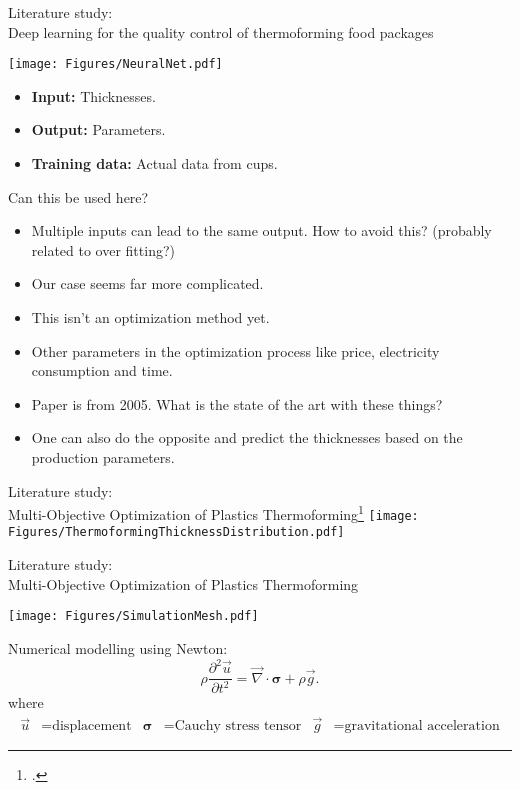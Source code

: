 \documentclass{beamer}
\begin{document}
	\begin{frame}{Literature study:\\Deep learning for the quality control of thermoforming food packages}
		\begin{center}
			\texttt{[image: Figures/NeuralNet.pdf]}
		\end{center}
		\begin{itemize}
			\item \textbf{Input:} Thicknesses.
			\item \textbf{Output:} Parameters.
			\item \textbf{Training data:} Actual data from cups.
		\end{itemize}
	\end{frame}

	\begin{frame}{Can this be used here?}
		\begin{itemize}
			\item Multiple inputs can lead to the same output. How to avoid this? (probably related to over fitting?)
			\pause
			\item Our case seems far more complicated.
			\pause
			\item This isn't an optimization method yet.
			\pause
			\item Other parameters in the optimization process like price, electricity consumption and time.
			\pause
			\item Paper is from 2005. What is the state of the art with these things?
			\pause
			\item One can also do the opposite and predict the thicknesses based on the production parameters.
		\end{itemize}
	\end{frame}

	\begin{frame}{Literature study:\\ Multi-Objective Optimization of Plastics Thermoforming\footcite{math9151760}}
		\centering
		\texttt{[image: Figures/ThermoformingThicknessDistribution.pdf]}
	\end{frame}

	\begin{frame}{Literature study:\\ Multi-Objective Optimization of Plastics Thermoforming}
		\begin{center}
			\texttt{[image: Figures/SimulationMesh.pdf]}
		\end{center}
		Numerical modelling using Newton:
		\[\rho\frac{\partial^2\vec{u}}{\partial t^2}=\vec{\nabla}\cdot \boldsymbol{\sigma}+\rho \vec{g}.\]
	where
	\begin{align*}
		\vec{u}&=\text{displacement}&\boldsymbol{\sigma}&=\text{Cauchy stress tensor}&\vec{g}&=\text{gravitational acceleration}
	\end{align*}
	\end{frame}
\end{document}
